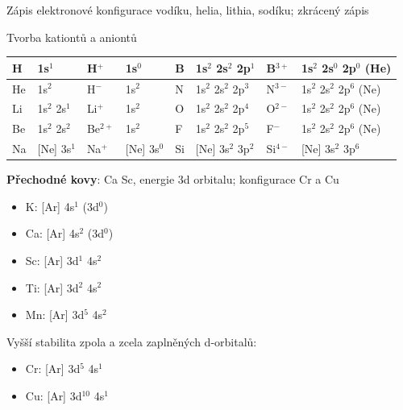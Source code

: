 Zápis elektronové konfigurace vodíku, helia, lithia, sodíku; zkrácený zápis

Tvorba kationtů a aniontů

\begin{tabular}{|l|l||l|l||l|l||l|l|}
	\hline
	H & 1s$^1$ & H$^+$ & 1s$^0$ & B & 1s$^2$ 2s$^2$ 2p$^1$ & B$^{3+}$ & 1s$^2$ 2s$^0$ 2p$^0$ (He) \\\hline
	He & 1s$^2$ & H$^-$ & 1s$^2$ & N & 1s$^2$ 2s$^2$ 2p$^3$ & N$^{3-}$ & 1s$^2$ 2s$^2$ 2p$^6$ (Ne) \\\hline
	Li & 1s$^2$ 2s$^1$ & Li$^+$ & 1s$^2$ & O & 1s$^2$ 2s$^2$ 2p$^4$ & O$^{2-}$ & 1s$^2$ 2s$^2$ 2p$^6$ (Ne) \\\hline
	Be & 1s$^2$ 2s$^2$ & Be$^{2+}$ & 1s$^2$ & F & 1s$^2$ 2s$^2$ 2p$^5$ & F$^{-}$ & 1s$^2$ 2s$^2$ 2p$^6$ (Ne) \\\hline
	Na & [Ne] 3s$^1$ & Na$^{+}$ & [Ne] 3s$^0$ & Si & [Ne] 3s$^2$ 3p$^2$ & Si$^{4-}$ & [Ne] 3s$^2$ 3p$^6$ \\\hline
\end{tabular}

\textbf{Přechodné kovy}: Ca \ce{->} Sc, energie 3d orbitalu; konfigurace Cr a Cu

\begin{itemize}
	\item K: [Ar] 4s$^1$ (3d$^0$)
	\item Ca: [Ar] 4s$^2$ (3d$^0$)
	\item Sc: [Ar] 3d$^1$ 4s$^2$
	\item Ti: [Ar] 3d$^2$ 4s$^2$
	\item Mn: [Ar] 3d$^5$ 4s$^2$
\end{itemize}

Vyšší stabilita zpola a zcela zaplněných d-orbitalů:
\begin{itemize}
	\item Cr: [Ar] 3d$^5$ 4s$^1$
	\item Cu: [Ar] 3d$^{10}$ 4s$^1$
\end{itemize}